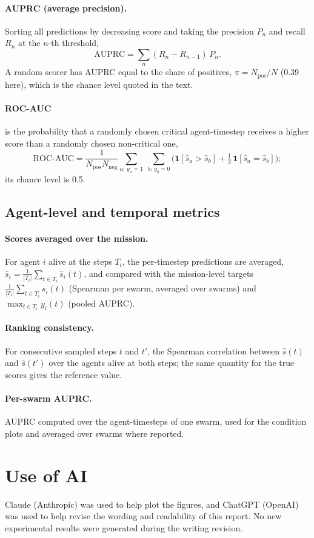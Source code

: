\documentclass[11pt,a4paper]{article}
\begin{document}
\paragraph{AUPRC (average precision).} Sorting all predictions by decreasing score and taking the precision $P_n$ and recall $R_n$ at the
$n$-th threshold,
\begin{equation}
\mathrm{AUPRC}=\sum_{n}(R_n-R_{n-1})\,P_n .
\end{equation}
A random scorer has AUPRC equal to the share of positives, $\pi=N_{\mathrm{pos}}/N$ (0.39 here), which is the chance level quoted in the text.
\paragraph{ROC-AUC} is the probability that a randomly chosen critical agent-timestep receives a higher score than a randomly chosen
non-critical one,
\begin{equation}
\mathrm{ROC\text{-}AUC}=\frac{1}{N_{\mathrm{pos}}N_{\mathrm{neg}}}\sum_{a:\,y_a=1}\ \sum_{b:\,y_b=0}\Big(\mathbf{1}[\hat s_a>\hat s_b]+\tfrac12\,\mathbf{1}[\hat s_a=\hat s_b]\Big);
\end{equation}
its chance level is 0.5.

\subsection*{Agent-level and temporal metrics}
\paragraph{Scores averaged over the mission.} For agent $i$ alive at the steps $T_i$, the per-timestep predictions are averaged,
$\bar s_i=\frac{1}{|T_i|}\sum_{t\in T_i}\hat s_i(t)$, and compared with the mission-level targets $\frac{1}{|T_i|}\sum_{t\in T_i}s_i(t)$
(Spearman per swarm, averaged over swarms) and $\max_{t\in T_i}y_i(t)$ (pooled AUPRC).
\paragraph{Ranking consistency.} For consecutive sampled steps $t$ and $t'$, the Spearman correlation between $\hat s(t)$ and
$\hat s(t')$ over the agents alive at both steps; the same quantity for the true scores gives the reference value.
\paragraph{Per-swarm AUPRC.} AUPRC computed over the agent-timesteps of one swarm, used for the condition plots and averaged over swarms
where reported.


\section*{Use of AI}
Claude (Anthropic) was used to help plot the figures, and ChatGPT (OpenAI) was used to help revise the wording and readability of this report. No new experimental results were generated during the writing revision.
\end{document}
